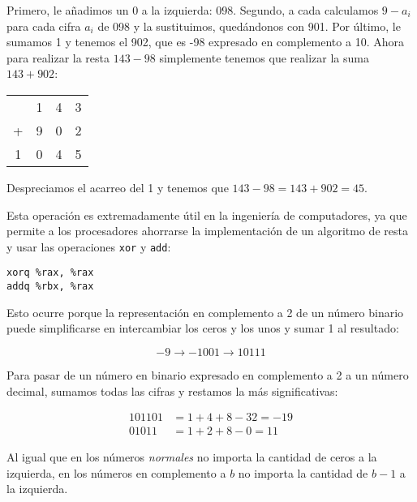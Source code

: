 Primero, le añadimos un 0 a la izquierda: 098.
Segundo, a cada calculamos $9 - a_i$ para cada cifra $a_i$ de 098 y la sustituimos, quedándonos con 901.
Por último, le sumamos 1 y tenemos el 902, que es -98 expresado en complemento a 10.
Ahora para realizar la resta $143 - 98$ simplemente tenemos que realizar la suma $143 + 902$:

\begin{center}
\setlength{\tabcolsep}{1ex}
\begin{tabular}{c c c c}
  & 1 & 4 & 3 \\
+ & 9 & 0 & 2 \\
\midrule
1 & 0 & 4 & 5 \\
\end{tabular}
\end{center}

Despreciamos el acarreo del 1 y tenemos que $143 - 98 = 143 + 902 = 45$.

Esta operación es extremadamente útil en la ingeniería de computadores, ya que permite a los procesadores ahorrarse la implementación de un algoritmo de resta y usar las operaciones \texttt{xor} y \texttt{add}:

\begin{lstlisting}[language={[x86masm]Assembler}]
xorq %rax, %rax
addq %rbx, %rax
\end{lstlisting}

Esto ocurre porque la representación en complemento a 2 de un número binario puede simplificarse en intercambiar los ceros y los unos y sumar 1 al resultado:

\[-9 \rightarrow -1001 \rightarrow 10111\]

Para pasar de un número en binario expresado en complemento a 2 a un número decimal, sumamos todas las cifras y restamos la más significativas:

\begin{align*}
	101101 & = 1 + 4 + 8 - 32 = -19 \\
	01011  & = 1 + 2 + 8 - 0 = 11
\end{align*}

Al igual que en los números \textit{normales} no importa la cantidad de ceros a la izquierda, en los números en complemento a $b$ no importa la cantidad de $b-1$ a la izquierda.
